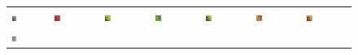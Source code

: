\begin{figure}[h!]
\begin{tabular}{C{0.14\textwidth}C{0.14\textwidth}C{0.14\textwidth}C{0.14\textwidth}C{0.14\textwidth}C{0.14\textwidth}C{0.14\textwidth}}
		\includegraphics[width=0.14\textwidth]{images/p03/p03_02.png} &
		\includegraphics[width=0.14\textwidth]{images/gen/number_of_segments/p03_02.png_5.png} &
		\includegraphics[width=0.14\textwidth]{images/gen/number_of_segments/p03_02.png_10.png} &
		\includegraphics[width=0.14\textwidth]{images/gen/number_of_segments/p03_02.png_20.png} &
		\includegraphics[width=0.14\textwidth]{images/gen/number_of_segments/p03_02.png_50.png} &
		\includegraphics[width=0.14\textwidth]{images/gen/number_of_segments/p03_02.png_75.png} &
		\includegraphics[width=0.14\textwidth]{images/gen/number_of_segments/p03_02.png_100.png} \\
		\includegraphics[width=0.14\textwidth]{images/p03/p03_03.png} &

\end{tabular}
\end{figure}
